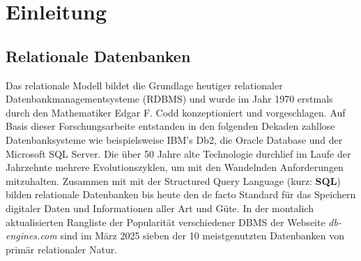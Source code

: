 \section{Einleitung}


\subsection{Relationale Datenbanken}



Das relationale Modell bildet die Grundlage heutiger relationaler Datenbankmanagementsysteme (RDBMS) und wurde im Jahr 1970 erstmals durch den Mathematiker Edgar F. Codd konzeptioniert und vorgeschlagen. \cite{coddRelationalModelData1970} Auf Basis dieser Forschungsarbeite entstanden in den folgenden Dekaden zahllose Datenbanksysteme wie beispielsweise IBM's Db2, die Oracle Database und der Microsoft SQL Server. Die über 50 Jahre alte Technologie durchlief im Laufe der Jahrzehnte mehrere Evolutionszyklen, um mit den Wandelnden Anforderungen mitzuhalten. Zusammen mit mit der Structured Query Language (kurz: \textbf{SQL}) bilden relationale Datenbanken bis heute den de facto  Standard für das Speichern digitaler Daten und Informationen aller Art und Güte. In der montalich aktualisierten Rangliste der Popularität verschiedener DBMS der Webseite \textit{db-engines.com} sind im März 2025 sieben der 10 meistgenutzten Datenbanken von primär relationaler Natur. \cite{redgatesoftwareltd.DBEnginesRanking2025}



